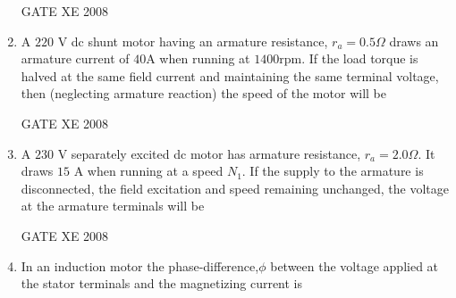 \documentclass[12pt]{article}
\begin{document}
\begin{enumerate}
\begin{enumerate}
\end{enumerate}

GATE XE 2008
\item A $220$ V dc shunt motor having an armature resistance, $r_{a}=0.5\Omega$ draws an armature current of $40$A when running at $1400$rpm. If the load torque is halved at the same field current and maintaining the same terminal voltage, then (neglecting armature reaction) the speed of the motor will be

\begin{enumerate}
\end{enumerate}

GATE XE 2008
\item A $230$ V separately excited dc motor has armature resistance, $r_{a} = 2.0\Omega$. It draws $15$ A when running at a speed $N_{1}$. If the supply to the armature is disconnected, the field excitation and speed remaining unchanged, the voltage at the armature terminals will be

\begin{enumerate}
\end{enumerate}

GATE XE 2008
\item In an induction motor the phase-difference,$\phi$ between the voltage applied at the stator terminals and the magnetizing current is

\begin{enumerate}
\end{enumerate}


\end{enumerate}
\end{document}
